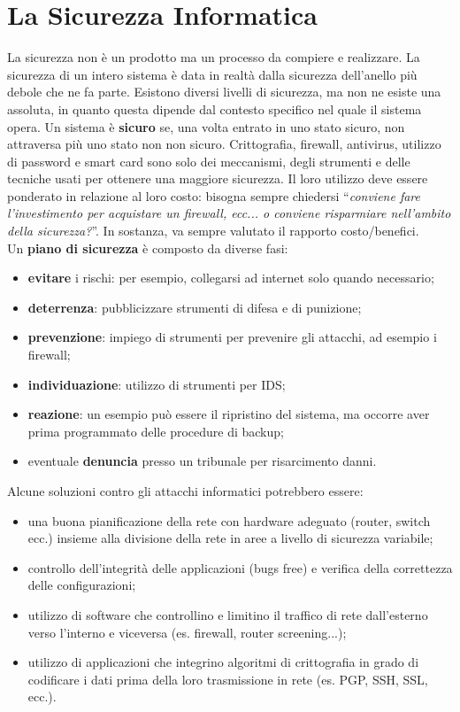 \section{La Sicurezza Informatica}

La sicurezza non è un prodotto ma un processo da compiere e realizzare.
La sicurezza di un intero sistema è data in realtà dalla sicurezza dell'anello
più debole che ne fa parte. Esistono diversi livelli di sicurezza, ma non ne
esiste una assoluta, in quanto questa dipende dal contesto specifico nel quale
il sistema opera.
Un sistema è \textbf{sicuro} se, una volta entrato in uno stato sicuro, non
attraversa più uno stato non non sicuro.
Crittografia, firewall, antivirus, utilizzo di password e smart card sono solo
dei meccanismi, degli strumenti e delle tecniche usati per ottenere una maggiore
sicurezza. Il loro utilizzo deve essere ponderato in relazione al loro costo:
bisogna sempre chiedersi “\textit{conviene fare l'investimento per acquistare un firewall,
      ecc... o conviene risparmiare nell'ambito della sicurezza?}”. In sostanza, va
sempre valutato il rapporto costo/benefici.\\
Un \textbf{piano di sicurezza} è composto da diverse fasi:

\begin{itemize}
      \item \textbf{evitare} i rischi: per esempio, collegarsi ad internet
            solo quando necessario;
      \item \textbf{deterrenza}: pubblicizzare strumenti di difesa e di punizione;
      \item \textbf{prevenzione}: impiego di strumenti per prevenire gli attacchi,
            ad esempio i firewall;
      \item \textbf{individuazione}: utilizzo di strumenti per IDS;
      \item \textbf{reazione}: un esempio può essere il ripristino del sistema,
            ma occorre aver prima programmato delle procedure di backup;
      \item eventuale \textbf{denuncia} presso un tribunale per risarcimento danni.
\end{itemize}

Alcune soluzioni contro gli attacchi informatici potrebbero essere:

\begin{itemize}
      \item una buona pianificazione della rete con hardware adeguato
            (router, switch ecc.) insieme alla divisione della rete in aree a livello
            di sicurezza variabile;
      \item controllo dell'integrità delle applicazioni (bugs free) e verifica
            della correttezza delle configurazioni;
      \item utilizzo di software che controllino e limitino il traffico di rete
            dall'esterno verso l'interno e viceversa (es. firewall, router screening...);
      \item utilizzo di applicazioni che integrino algoritmi di crittografia in
            grado di codificare i dati prima della loro trasmissione in rete
            (es. PGP, SSH, SSL, ecc.).
\end{itemize}

